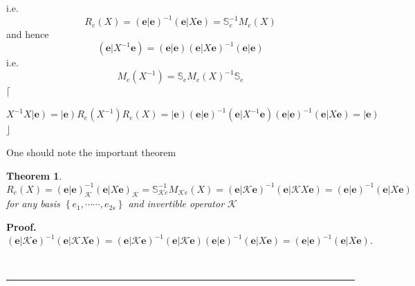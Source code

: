 \documentclass[aps,preprint]{revtex4}%
\newtheorem{theorem}{Theorem}
\newenvironment{proof}[1][Proof]{\noindent\textbf{#1.} }{\ \rule{0.5em}{0.5em}}
\begin{document}
i.e.
\begin{equation}
R_{e}\left(  X\right)  =\left(  \left.  \mathbf{e}\right\vert \mathbf{e}%
\right)  ^{-1}\left(  \left.  \mathbf{e}\right\vert X\mathbf{e}\right)
=\mathbb{S}_{e}^{-1}M_{e}\left(  X\right)
\end{equation}
and hence
\begin{equation}
\left(  \left.  \mathbf{e}\right\vert X^{-1}\mathbf{e}\right)  =\left(
\left.  \mathbf{e}\right\vert \mathbf{e}\right)  \left(  \left.
\mathbf{e}\right\vert X\mathbf{e}\right)  ^{-1}\left(  \left.  \mathbf{e}%
\right\vert \mathbf{e}\right)
\end{equation}
i.e.
\begin{equation}
M_{e}\left(  X^{-1}\right)  =\mathbb{S}_{e}M_{e}\left(  X\right)
^{-1}\mathbb{S}_{e}%
\end{equation}
$\lceil$%

\begin{equation}
X^{-1}X\left\vert \mathbf{e}\right)  =\left\vert \mathbf{e}\right)
R_{e}\left(  X^{-1}\right)  R_{e}\left(  X\right)  =\left\vert \mathbf{e}%
\right)  \left(  \left.  \mathbf{e}\right\vert \mathbf{e}\right)  ^{-1}\left(
\left.  \mathbf{e}\right\vert X^{-1}\mathbf{e}\right)  \left(  \left.
\mathbf{e}\right\vert \mathbf{e}\right)  ^{-1}\left(  \left.  \mathbf{e}%
\right\vert X\mathbf{e}\right)  =\left\vert \mathbf{e}\right)
\end{equation}
$\rfloor$

One should note the important theorem

\begin{theorem}%
\begin{equation}
R_{e}\left(  X\right)  =\left(  \left.  \mathbf{e}\right\vert \mathbf{e}%
\right)  _{\mathcal{K}}^{-1}\left(  \left.  \mathbf{e}\right\vert
X\mathbf{e}\right)  _{\mathcal{K}}=\mathbb{S}_{\mathcal{K}e}^{-1}%
M_{\mathcal{K}e}\left(  X\right)  =\left(  \left.  \mathbf{e}\right\vert
\mathcal{K}\mathbf{e}\right)  ^{-1}\left(  \left.  \mathbf{e}\right\vert
\mathcal{K}X\mathbf{e}\right)  =\left(  \left.  \mathbf{e}\right\vert
\mathbf{e}\right)  ^{-1}\left(  \left.  \mathbf{e}\right\vert X\mathbf{e}%
\right)
\end{equation}
for any basis $\left\{  e_{1},\cdots\cdots,e_{2s}\right\}  $ and invertible
operator $\mathcal{K}$
\end{theorem}

\begin{proof}%
\begin{equation}
\left(  \left.  \mathbf{e}\right\vert \mathcal{K}\mathbf{e}\right)
^{-1}\left(  \left.  \mathbf{e}\right\vert \mathcal{K}X\mathbf{e}\right)
=\left(  \left.  \mathbf{e}\right\vert \mathcal{K}\mathbf{e}\right)
^{-1}\left(  \left.  \mathbf{e}\right\vert \mathcal{K}\mathbf{e}\right)
\left(  \left.  \mathbf{e}\right\vert \mathbf{e}\right)  ^{-1}\left(  \left.
\mathbf{e}\right\vert X\mathbf{e}\right)  =\left(  \left.  \mathbf{e}%
\right\vert \mathbf{e}\right)  ^{-1}\left(  \left.  \mathbf{e}\right\vert
X\mathbf{e}\right)  .
\end{equation}

\end{proof}
\end{document}

